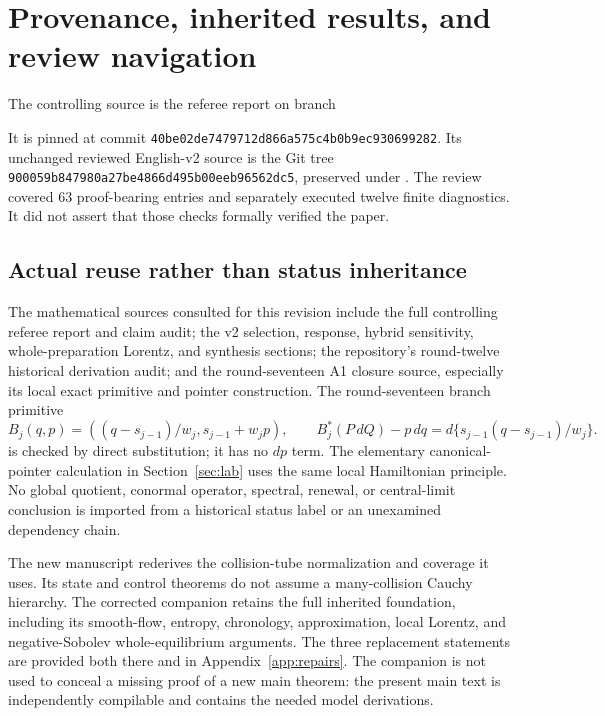 \section{Provenance, inherited results, and review navigation}\label{app:provenance}
The controlling source is the referee report on branch
\begin{quote}\small
{}
\end{quote}
It is pinned at commit
\texttt{40be02de7479712d866a575c4b0b9ec930699282}. Its unchanged reviewed
English-v2 source is the Git tree
\texttt{900059b847980a27be4866d495b00eeb96562dc5}, preserved under
. The review covered 63
proof-bearing entries and separately executed twelve finite diagnostics.
It did not assert that those checks formally verified the paper.

\subsection{Actual reuse rather than status inheritance}
The mathematical sources consulted for this revision include the full
controlling referee report and claim audit; the v2 selection, response,
hybrid sensitivity, whole-preparation Lorentz, and synthesis sections;
the repository's round-twelve historical derivation audit; and the
round-seventeen A1 closure source, especially its local exact primitive and
pointer construction. The round-seventeen branch primitive
\[
 B_j(q,p)=((q-s_{j-1})/w_j,s_{j-1}+w_jp),\qquad
 B_j^*(P\,dQ)-p\,dq=d\{s_{j-1}(q-s_{j-1})/w_j\}.
\]
is checked by direct substitution; it has no $dp$ term. The elementary
canonical-pointer calculation in Section~\ref{sec:lab} uses the same local
Hamiltonian principle. No global quotient, conormal operator, spectral,
renewal, or central-limit conclusion is imported from a historical status
label or an unexamined dependency chain.

The new manuscript rederives the collision-tube normalization and coverage
it uses. Its state and control theorems do not assume a many-collision
Cauchy hierarchy. The corrected companion retains the full inherited
foundation, including its smooth-flow, entropy, chronology, approximation,
local Lorentz, and negative-Sobolev whole-equilibrium arguments. The three
replacement statements are provided both there and in
Appendix~\ref{app:repairs}. The companion is not used to conceal a missing
proof of a new main theorem: the present main text is independently
compilable and contains the needed model derivations.

